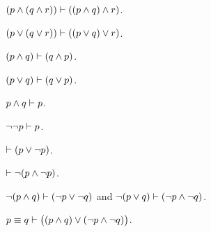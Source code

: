 \begin{definition}
  $(p \land (q \land r)) \vdash ((p \land q) \land r)$.
\end{definition}

\begin{definition}
  $(p \lor (q \lor r)) \vdash ((p \lor q) \lor r)$.
\end{definition}

\begin{definition}
  $(p \land q) \vdash (q \land p)$.
\end{definition}

\begin{definition}
  $(p \lor q) \vdash (q \lor p)$.
\end{definition}

\begin{definition}
  $p \land q \vdash p$.
\end{definition}

\begin{definition}
  $\neg\neg p \vdash p$.
\end{definition}

\indexsym{}
\begin{definition}
  $\vdash (p \lor \neg p)$.
\end{definition}

\begin{definition}
  $\vdash \neg(p \land \neg p)$.
\end{definition}

\begin{definition}
  $\neg(p \land q) \vdash (\neg p \lor \neg q)$
    and $\neg(p \lor q) \vdash (\neg p \land \neg q)$.
\end{definition}

\indexsym{}
\begin{definition}
  $p\equiv q \vdash \big((p \land q) \lor (\neg p \land \neg q)\big)$.
\end{definition}

